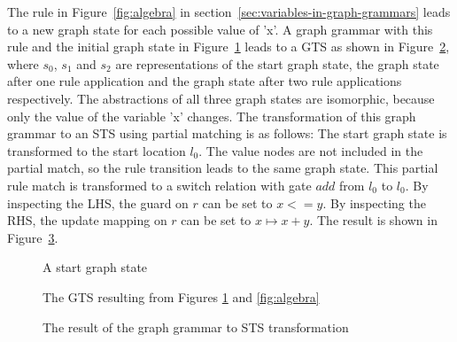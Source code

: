 The rule in Figure~\ref{fig:algebra} in section~\ref{sec:variables-in-graph-grammars} leads to a new graph state for each possible value of 'x'. A graph grammar with this rule and the initial graph state in Figure~\ref{fig:algebra_start_graph} leads to a GTS as shown in Figure~\ref{fig:algebra_gts}, where $s_0$, $s_1$ and $s_2$ are representations of the start graph state, the graph state after one rule application and  the graph state after two rule applications respectively. The abstractions of all three graph states are isomorphic, because only the value of the variable 'x' changes. The transformation of this graph grammar to an STS using partial matching is as follows: The start graph state is transformed to the start location $l_0$. The value nodes are not included in the partial match, so the rule transition leads to the same graph state. This partial rule match is transformed to a switch relation with gate $add$ from $l_0$ to $l_0$. By inspecting the LHS, the guard on $r$ can be set to $x <= y$. By inspecting the RHS, the update mapping on $r$ can be set to $x \mapsto x + y$. The result is shown in Figure~\ref{fig:algebra_sts}.

\begin{figure}[ht]
  \begin{center}
    
  \end{center}
  \caption{A start graph state}
  \label{fig:algebra_start_graph}
\end{figure}

\begin{figure}[ht]
  \begin{center}
    
  \end{center}
  \caption{The GTS resulting from Figures \ref{fig:algebra_start_graph} and \ref{fig:algebra}}
  \label{fig:algebra_gts}
\end{figure}

\begin{figure}[ht]
  \begin{center}
    
  \end{center}
  \caption{The result of the graph grammar to STS transformation}
  \label{fig:algebra_sts}
\end{figure}

